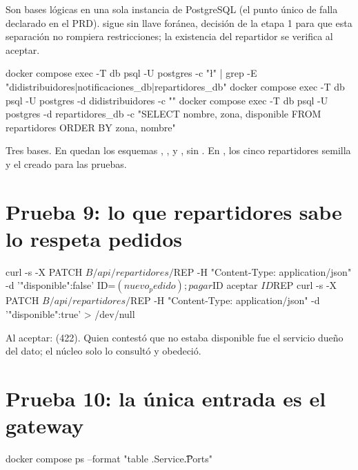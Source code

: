 \documentclass[11pt]{article}
\begin{document}
\comofunciona Son bases lógicas en una sola instancia de PostgreSQL (el punto único de falla declarado en
el PRD).  sigue sin llave foránea, decisión de la etapa 1 para que esta
separación no rompiera restricciones; la existencia del repartidor se verifica al aceptar.

\begin{comando}
docker compose exec -T db psql -U postgres -c "\l" | grep -E "didistribuidores|notificaciones_db|repartidores_db"
docker compose exec -T db psql -U postgres -d didistribuidores -c "\dn"
docker compose exec -T db psql -U postgres -d repartidores_db -c "SELECT nombre, zona, disponible FROM repartidores ORDER BY zona, nombre"
\end{comando}

\observado Tres bases. En  quedan los esquemas , ,
 y , sin . En , los cinco repartidores
semilla y el creado para las pruebas.

\section{Prueba 9: lo que repartidores sabe lo respeta pedidos}

\begin{comando}
curl -s -X PATCH $B/api/repartidores/$REP -H "Content-Type: application/json" -d '{"disponible":false}'
ID=$(nuevo_pedido); pagar $ID
aceptar $ID $REP
curl -s -X PATCH $B/api/repartidores/$REP -H "Content-Type: application/json" -d '{"disponible":true}' > /dev/null
\end{comando}

\observado Al aceptar:  (422). Quien contestó que
no estaba disponible fue el servicio dueño del dato; el núcleo solo lo consultó y obedeció.

\section{Prueba 10: la única entrada es el gateway}

\begin{comando}
docker compose ps --format "table {{.Service}}\t{{.Ports}}"
\end{comando}
\end{document}

